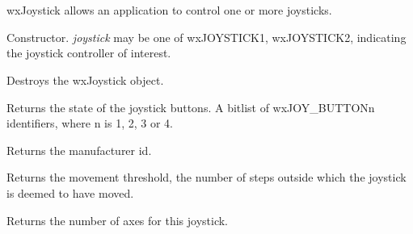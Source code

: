 \section{}\label{wxjoystick}

wxJoystick allows an application to control one or more joysticks.






\label{wxjoystickconstr}


Constructor. {\it joystick} may be one of wxJOYSTICK1, wxJOYSTICK2, indicating the joystick
controller of interest.



Destroys the wxJoystick object.

\label{wxjoystickgetbuttonstate}


Returns the state of the joystick buttons. A bitlist of wxJOY\_BUTTONn identifiers,
where n is 1, 2, 3 or 4.

\label{wxjoystickgetmanufacturerid}


Returns the manufacturer id.

\label{wxjoystickgetmovementthreshold}


Returns the movement threshold, the number of steps outside which the joystick is deemed to have
moved.

\label{wxjoystickgetnumberaxes}


Returns the number of axes for this joystick.

\label{wxjoystickgetnumberbuttons}

